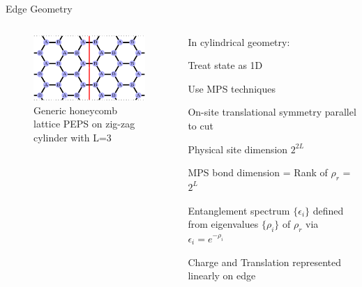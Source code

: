 \begin{frame}{Edge Geometry}
\vskip-1.5cm

\begin{columns}[T]
  \begin{column}[T]{.5\textwidth}
  		\begin{figure}
			\includegraphics[width=.8\textwidth]{diagrams/HEX_PEPS.pdf}
			\caption{Generic honeycomb lattice PEPS on zig-zag cylinder with L=3}
		\end{figure}
  \end{column}
  \begin{column}[T]{.5\textwidth}
  \vskip0.5cm
  \bi
  \item[] In cylindrical geometry:
  \item Treat state as 1D
  \item Use MPS techniques
  \item On-site translational symmetry parallel to cut
  \item Physical site dimension $2^{2L}$
  \item MPS bond dimension = Rank of $\rho_{r}$ =  $2^L$
  \item Entanglement spectrum $\{\epsilon_i\}$ defined from eigenvalues $\{\rho_i\}$ of $\rho_{r}$ via $\epsilon_i = e^{-\rho_i}$
  \item Charge and Translation represented linearly on edge
  \ei
  \end{column}
\end{columns}
\end{frame}